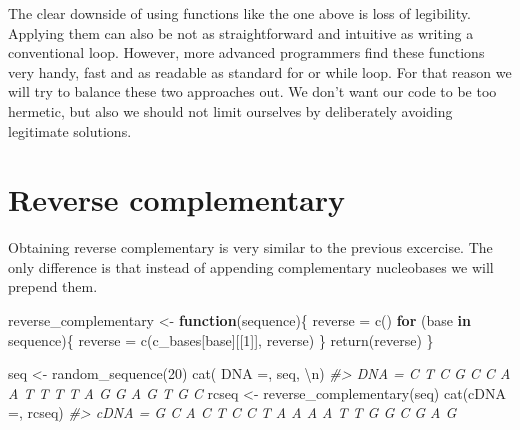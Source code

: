 \documentclass[
]{book}
\newenvironment{Shaded}{\begin{snugshade}}{\end{snugshade}}
\newcommand{\CommentTok}[1]{\textcolor[rgb]{0.56,0.35,0.01}{\textit{#1}}}
\newcommand{\ControlFlowTok}[1]{\textcolor[rgb]{0.13,0.29,0.53}{\textbf{#1}}}
\newcommand{\DecValTok}[1]{\textcolor[rgb]{0.00,0.00,0.81}{#1}}
\newcommand{\FunctionTok}[1]{\textcolor[rgb]{0.00,0.00,0.00}{#1}}
\newcommand{\NormalTok}[1]{#1}
\newcommand{\OtherTok}[1]{\textcolor[rgb]{0.56,0.35,0.01}{#1}}
\newcommand{\SpecialCharTok}[1]{\textcolor[rgb]{0.00,0.00,0.00}{#1}}
\newcommand{\StringTok}[1]{\textcolor[rgb]{0.31,0.60,0.02}{#1}}
\begin{document}
The clear downside of using functions like the one above is loss of legibility. Applying them can also be not as straightforward and intuitive as writing a conventional loop. However, more advanced programmers find these functions very handy, fast and as readable as standard for or while loop. For that reason we will try to balance these two approaches out. We don't want our code to be too hermetic, but also we should not limit ourselves by deliberately avoiding legitimate solutions.

\hypertarget{reverse-complementary}{%
\section{Reverse complementary}\label{reverse-complementary}}

Obtaining reverse complementary is very similar to the previous excercise. The only difference is that instead of appending complementary nucleobases we will prepend them.

\begin{Shaded}
\begin{Highlighting}[]
\NormalTok{reverse\_complementary }\OtherTok{\textless{}{-}} \ControlFlowTok{function}\NormalTok{(sequence)\{}
\NormalTok{  reverse }\OtherTok{=} \FunctionTok{c}\NormalTok{()}
  \ControlFlowTok{for}\NormalTok{ (base }\ControlFlowTok{in}\NormalTok{ sequence)\{}
\NormalTok{    reverse }\OtherTok{=} \FunctionTok{c}\NormalTok{(c\_bases[base][[}\DecValTok{1}\NormalTok{]], reverse)}
\NormalTok{  \}}
  \FunctionTok{return}\NormalTok{(reverse)}
\NormalTok{\}}
\end{Highlighting}
\end{Shaded}

\begin{Shaded}
\begin{Highlighting}[]
\NormalTok{seq }\OtherTok{\textless{}{-}} \FunctionTok{random\_sequence}\NormalTok{(}\DecValTok{20}\NormalTok{)}
\FunctionTok{cat}\NormalTok{(}\StringTok{\textquotesingle{} DNA =\textquotesingle{}}\NormalTok{, seq, }\StringTok{\textquotesingle{}}\SpecialCharTok{\textbackslash{}n}\StringTok{\textquotesingle{}}\NormalTok{)}
\CommentTok{\#\textgreater{}  DNA = C T C G C C A A T T T T A G G A G T G C}
\NormalTok{rcseq }\OtherTok{\textless{}{-}} \FunctionTok{reverse\_complementary}\NormalTok{(seq)}
\FunctionTok{cat}\NormalTok{(}\StringTok{\textquotesingle{}cDNA =\textquotesingle{}}\NormalTok{, rcseq)}
\CommentTok{\#\textgreater{} cDNA = G C A C T C C T A A A A T T G G C G A G}
\end{Highlighting}
\end{Shaded}
\end{document}
